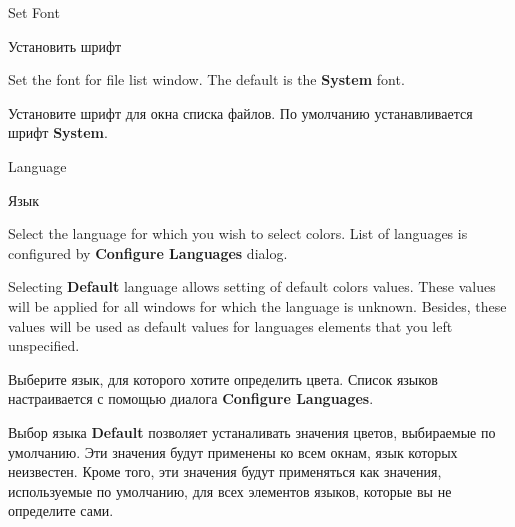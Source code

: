 \begin{popup}
\ifenglish
\caption{Set Font}
\else
\caption{Установить шрифт}
\fi
{}

\ifenglish
Set the font for file list window. The default is the {\bf System} font.

\else
Установите шрифт для окна списка файлов. По умолчанию устанавливается шрифт
{\bf System}.
\fi
\end{popup}


\begin{popup}
\ifenglish
\caption{Language}
\else
\caption{Язык}
\fi
{}

\ifenglish
Select the language for which you wish to select colors.
List of languages is configured by {\bf Configure Languages} dialog.

Selecting {\bf Default} language allows setting of default colors values.
These values will be applied for all windows for which the language is unknown.
Besides, these values will be used as default values for languages elements
that you left unspecified.

\else
Выберите язык, для которого хотите определить цвета.
Список языков настраивается с помощью диалога {\bf Configure Languages}.

Выбор языка {\bf Default} позволяет устаналивать значения цветов, выбираемые
по умолчанию. Эти значения будут применены ко всем окнам, язык которых
неизвестен. Кроме того, эти значения будут применяться как значения,
используемые по умолчанию, для всех элементов языков, которые вы не определите
сами.
\fi
\end{popup}

